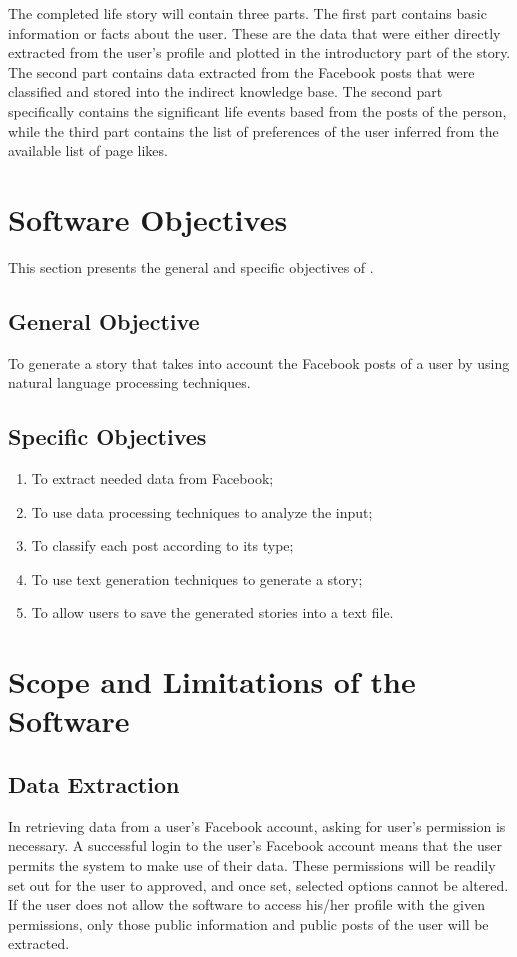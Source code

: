 The completed life story will contain three parts. The first part contains basic information or facts about the user. These are the data that were either directly extracted from the user’s profile and plotted in the introductory part of the story. The second part contains data extracted from the Facebook posts that were classified and stored into the indirect knowledge base. The second part specifically contains the significant life events based from the posts of the person, while the third part contains the list of preferences of the user inferred from the available list of page likes.

\section{Software Objectives}
This section presents the general and specific objectives of \systemname.

\subsection{General Objective}
To generate a story that takes into account the Facebook posts of a user by using natural language processing techniques.

\subsection{Specific Objectives}
\begin{enumerate}
\item To extract needed data from Facebook;
\item To use data processing techniques to analyze the input; 
\item To classify each post according to its type;
\item To use text generation techniques to generate a story;
\item To allow users to save the generated stories into a text file.
\end{enumerate}

\section{Scope and Limitations of the Software}

\subsection{Data Extraction}
In retrieving data from a user’s Facebook account, asking for user’s permission is necessary. A successful login to the user’s Facebook account means that the user permits the system to make use of their data. These permissions will be readily set out for the user to approved, and once set, selected options cannot be altered. If the user does not allow the software to access his/her profile with the given permissions, only those public information and public posts of the user will be extracted. 


